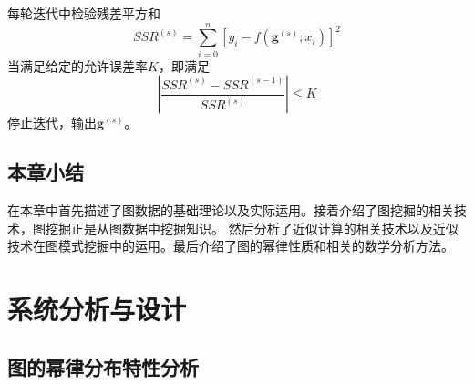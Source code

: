 \documentclass[master]{thesis-uestc}
\begin{document}
每轮迭代中检验残差平方和
\begin{equation*}
    SSR^{(s)}=\sum_{i=0}^n\left[y_i-f\left( \mathbf{g}^{(s)};x_i\right)\right]^2
\end{equation*}
当满足给定的允许误差率$K$，即满足
\begin{equation*}
    \left|\frac{S S R^{(s)}-S S R^{(s-1)}}{S S R^{(s)}}\right| \leq K
\end{equation*}
停止迭代，输出$\mathbf{g}^{(s)}$。

\section{本章小结}
\label{sec:theroy-summary}
    在本章中首先描述了图数据的基础理论以及实际运用。接着介绍了图挖掘的相关技术，图挖掘正是从图数据中挖掘知识。
然后分析了近似计算的相关技术以及近似技术在图模式挖掘中的运用。最后介绍了图的幂律性质和相关的数学分析方法。


\chapter{系统分析与设计}

\section{图的幂律分布特性分析}
\label{sec:pow-law-analysis}
\end{document}
